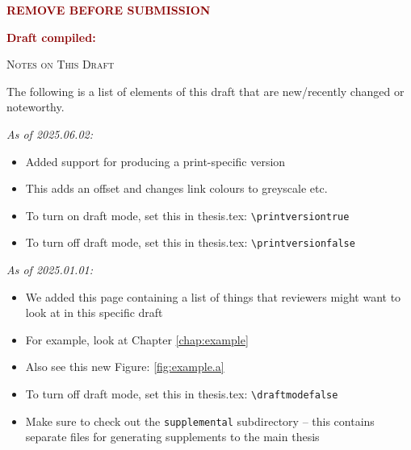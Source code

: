 {\bfseries \textcolor{darkred}{\selectfont \Huge REMOVE BEFORE SUBMISSION}}

\vspace{5mm}

{\bfseries \textcolor{darkred}{\selectfont \huge Draft compiled: \DTMnow}}

\vspace{10mm}


{\LARGE\textsc{Notes on This Draft}}

\vspace{10mm}

The following is a list of elements of this draft that are new/recently changed or noteworthy.


\textit{As of 2025.06.02:}
\begin{itemize}[topsep=0pt, itemsep=8pt]
	\item Added support for producing a print-specific version
	\item This adds an offset and changes link colours to greyscale etc.
	\item To turn on draft mode, set this in thesis.tex: \texttt{{\textbackslash}printversiontrue}
	\item To turn off draft mode, set this in thesis.tex: \texttt{{\textbackslash}printversionfalse}
\end{itemize}



\textit{As of 2025.01.01:}
\begin{itemize}[topsep=0pt, itemsep=8pt]
	\item We added this page containing a list of things that reviewers might want to look at in this specific draft
	\item For example, look at Chapter \ref{chap:example}
	\item Also see this new Figure: \ref{fig:example.a}
	\item To turn off draft mode, set this in thesis.tex: \texttt{{\textbackslash}draftmodefalse}
	\item Make sure to check out the \texttt{supplemental} subdirectory -- this contains separate files for generating supplements to the main thesis
\end{itemize}


